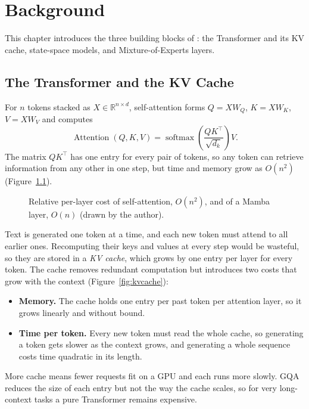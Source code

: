 \chapter{Background}
\label{ch:background}

This chapter introduces the three building blocks of \NS: the Transformer and
its KV cache, state-space models, and Mixture-of-Experts layers.

\section{The Transformer and the KV Cache}

For $n$ tokens stacked as $X \in \mathbb{R}^{n \times d}$, self-attention
forms $Q = XW_Q$, $K = XW_K$, $V = XW_V$ and computes~\cite{vaswani2017attention}
\begin{equation}
  \operatorname{Attention}(Q,K,V) =
  \operatorname{softmax}\!\left(\frac{QK^{\top}}{\sqrt{d_k}}\right)V .
  \label{eq:attention}
\end{equation}
The matrix $QK^{\top}$ has one entry for every pair of tokens, so any token can
retrieve information from any other in one step, but time and memory grow as
$O(n^2)$ (Figure~\ref{fig:complexity}).

\begin{figure}[!htbp]
  \centering
  
  \caption[Quadratic cost of self-attention versus linear cost of Mamba]{Relative
  per-layer cost of self-attention, $O(n^2)$, and of a Mamba layer, $O(n)$
  (drawn by the author).}
  \label{fig:complexity}
\end{figure}

Text is generated one token at a time, and each new token must attend to all
earlier ones. Recomputing their keys and values at every step would be
wasteful, so they are stored in a \emph{KV cache}, which grows by one entry per
layer for every token. The cache removes redundant computation but introduces
two costs that grow with the context (Figure~\ref{fig:kvcache}):
\begin{itemize}
  \item \textbf{Memory.} The cache holds one entry per past token per
        attention layer, so it grows linearly and without bound.
  \item \textbf{Time per token.} Every new token must read the whole cache, so
        generating a token gets slower as the context grows, and generating a
        whole sequence costs time quadratic in its length.
\end{itemize}
More cache means fewer requests fit on a GPU and each runs more slowly. GQA
reduces the size of each entry but not the way the cache scales, so for very
long-context tasks a pure Transformer remains expensive.

